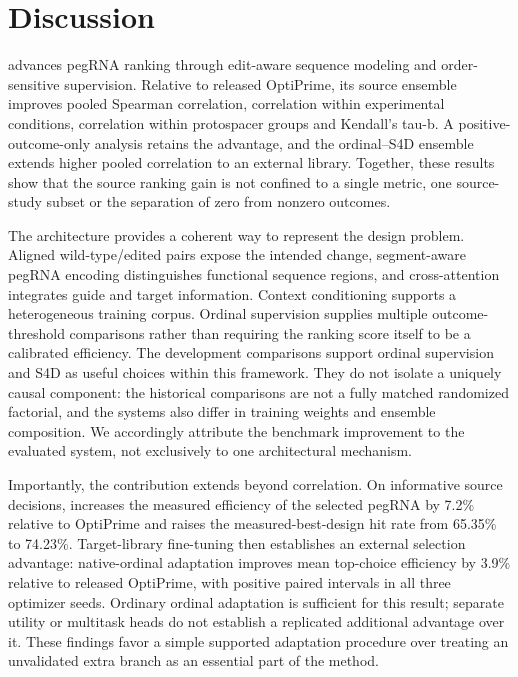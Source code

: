 \section{Discussion}
\model{} advances pegRNA ranking through edit-aware sequence modeling and order-sensitive supervision. Relative to released OptiPrime, its source ensemble improves pooled Spearman correlation, correlation within experimental conditions, correlation within protospacer groups and Kendall's tau-b. A positive-outcome-only analysis retains the advantage, and the ordinal--S4D ensemble extends higher pooled correlation to an external library. Together, these results show that the source ranking gain is not confined to a single metric, one source-study subset or the separation of zero from nonzero outcomes.

The architecture provides a coherent way to represent the design problem. Aligned wild-type/edited pairs expose the intended change, segment-aware pegRNA encoding distinguishes functional sequence regions, and cross-attention integrates guide and target information. Context conditioning supports a heterogeneous training corpus. Ordinal supervision supplies multiple outcome-threshold comparisons rather than requiring the ranking score itself to be a calibrated efficiency. The development comparisons support ordinal supervision and S4D as useful choices within this framework. They do not isolate a uniquely causal component: the historical comparisons are not a fully matched randomized factorial, and the systems also differ in training weights and ensemble composition. We accordingly attribute the benchmark improvement to the evaluated \model{} system, not exclusively to one architectural mechanism.

Importantly, the contribution extends beyond correlation. On informative source decisions, \model{} increases the measured efficiency of the selected pegRNA by 7.2\% relative to OptiPrime and raises the measured-best-design hit rate from 65.35\% to 74.23\%. Target-library fine-tuning then establishes an external selection advantage: native-ordinal adaptation improves mean top-choice efficiency by 3.9\% relative to released OptiPrime, with positive paired intervals in all three optimizer seeds. Ordinary ordinal adaptation is sufficient for this result; separate utility or multitask heads do not establish a replicated additional advantage over it. These findings favor a simple supported adaptation procedure over treating an unvalidated extra branch as an essential part of the method.

